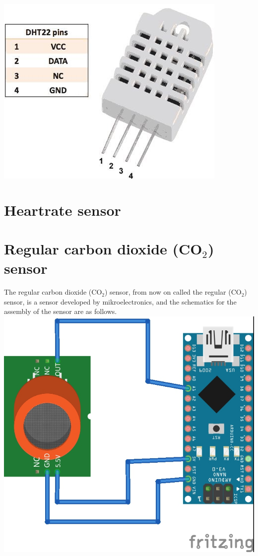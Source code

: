 \documentclass{report}
\begin{document}
\includegraphics[scale=0.25]{images/DHT22.jpg}


\chapter{Heartrate sensor}

\chapter{Regular carbon dioxide (CO$_2$) sensor}
The regular carbon dioxide (CO$_2$) sensor, from now on called the regular (CO$_2$) sensor, is a sensor developed by mikroelectronics, and the schematics for the assembly of the sensor are as follows. \\

\includegraphics[scale=1]{images/Mikroe-Gas-sensor-schematic.jpg}
\end{document}
